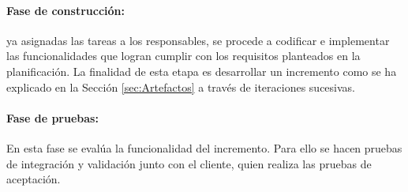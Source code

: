 \paragraph{Fase de construcción: } ya asignadas las tareas a los responsables, se procede a codificar e implementar las funcionalidades que logran cumplir con los requisitos planteados en la planificación. La finalidad de esta etapa es desarrollar un incremento como se ha explicado en la Sección \ref{sec:Artefactos} a través de iteraciones sucesivas.

\paragraph{Fase de pruebas: } En esta fase se evalúa la funcionalidad del incremento. Para ello se hacen pruebas de integración y validación junto con el cliente, quien realiza las pruebas de aceptación.
